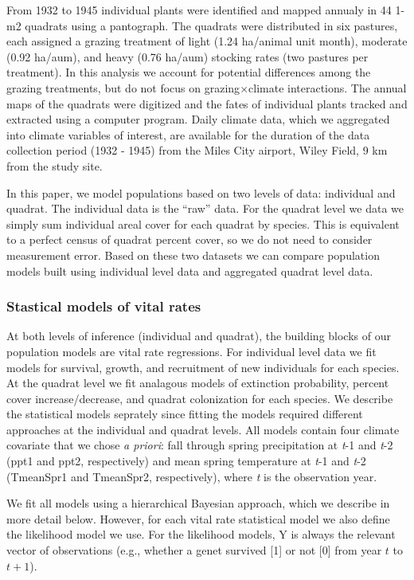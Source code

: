 \documentclass[author-year, 12pt,review]{components/elsarticle} %
\begin{document}
From 1932 to 1945 individual plants were identified and mapped annualy
in 44 1-m2 quadrats using a pantograph. The quadrats were distributed in
six pastures, each assigned a grazing treatment of light (1.24 ha/animal
unit month), moderate (0.92 ha/aum), and heavy (0.76 ha/aum) stocking
rates (two pastures per treatment). In this analysis we account for
potential differences among the grazing treatments, but do not focus on
grazing$\times$climate interactions. The annual maps of the quadrats
were digitized and the fates of individual plants tracked and extracted
using a computer program. Daily climate data, which we aggregated into
climate variables of interest, are available for the duration of the
data collection period (1932 - 1945) from the Miles City airport, Wiley
Field, 9 km from the study site.

In this paper, we model populations based on two levels of data:
individual and quadrat. The individual data is the ``raw'' data. For the
quadrat level we data we simply sum individual areal cover for each
quadrat by species. This is equivalent to a perfect census of quadrat
percent cover, so we do not need to consider measurement error. Based on
these two datasets we can compare population models built using
individual level data and aggregated quadrat level data.

\subsubsection{Stastical models of vital
rates}\label{stastical-models-of-vital-rates}

At both levels of inference (individual and quadrat), the building
blocks of our population models are vital rate regressions. For
individual level data we fit models for survival, growth, and
recruitment of new individuals for each species. At the quadrat level we
fit analagous models of extinction probability, percent cover
increase/decrease, and quadrat colonization for each species. We
describe the statistical models seprately since fitting the models
required different approaches at the individual and quadrat levels. All
models contain four climate covariate that we chose \emph{a priori}:
fall through spring precipitation at \emph{t}-1 and \emph{t}-2 (ppt1 and
ppt2, respectively) and mean spring temperature at \emph{t}-1 and
\emph{t}-2 (TmeanSpr1 and TmeanSpr2, respectively), where \emph{t} is
the observation year.

We fit all models using a hierarchical Bayesian approach, which we
describe in more detail below. However, for each vital rate statistical
model we also define the likelihood model we use. For the likelihood
models, Y is always the relevant vector of observations (e.g., whether a
genet survived {[}1{]} or not {[}0{]} from year $t$ to $t+1$).
\end{document}
